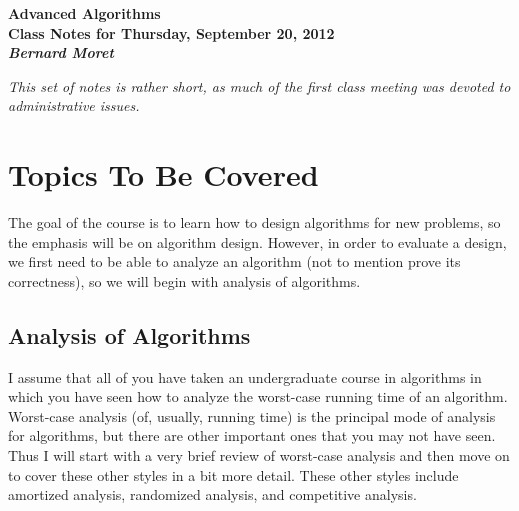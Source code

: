 \documentclass{article}
\begin{document}
\begin{center}
  \LARGE\bf Advanced Algorithms\\

  \Large\sf
  Class Notes for Thursday, September 20, 2012\\

  \it
  Bernard Moret
\end{center}

\bigskip
\emph{This set of notes is rather short, as much of the first
class meeting was devoted to administrative issues.}

\bigskip
\section{Topics To Be Covered}
The goal of the course is to learn how to design algorithms for
new problems, so the emphasis will be on algorithm design.  However,
in order to evaluate a design, we first need to be able to analyze
an algorithm (not to mention prove its correctness), so we will
begin with analysis of algorithms.

\subsection{Analysis of Algorithms}
I assume that all of you have taken an undergraduate course in algorithms
in which you have seen how to analyze the worst-case running time of
an algorithm.  Worst-case analysis (of, usually, running time)
is the principal mode of analysis for algorithms, but there are other
important ones that you may not have seen.   Thus I will start with a
very brief review of worst-case analysis and then move on to cover
these other styles in a bit more detail.  These other styles include
amortized analysis, randomized analysis, and competitive analysis.
\end{document}
